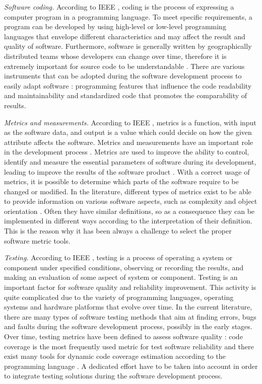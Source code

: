 \documentclass[journal]{IEEEtran}
\begin{document}
\emph{Software coding.} According to IEEE \cite{radatz}, coding is the process of expressing a computer
program in a programming language. To meet specific requirements, a program can be developed by using
high-level or low-level programming languages that envelope different characteristics and may affect the
result and quality of software. Furthermore, software is generally written by geographically distributed
teams whose developers can change over time, therefore it is extremely important for source code to be
understandable \cite{tashtoush}. There are various instruments that can be adopted during the software
development process to easily adapt software \cite{buse, baggen}: programming features that influence the
code readability and maintainability and standardized code that promotes the comparability of results. 

\emph{Metrics and measurements.} According to IEEE \cite{radatz}, metrics is a function, with input as 
the software data, and output is a value which could decide on how the given attribute affects the software.
Metrics and measurements have an important role in the development process \cite{fenton, capers}. Metrics
are used to improve the ability to control, identify and measure the essential parameters of software 
during its development, leading to improve the results of the software product \cite{goodman}. With a correct
usage of metrics, it is possible to determine which parts of the software require to be changed or modified.
In the literature, different types of metrics exist to be able to provide information on various software
aspects, such as complexity \cite{mccabe} and object orientation \cite{chidamber, lorenz}. Often they have 
similar definitions, so as a consequence they can be implemented in different ways according to the
interpretation of their definition. This is the reason why it has been always a challenge to select the
proper software metric tools.

\emph{Testing.} According to IEEE \cite{radatz}, testing is a process of operating a system or component
under specified conditions, observing or recording the results, and making an evaluation of some aspect of
system or component. Testing is an important factor for software quality and reliability improvement. This
activity is quite complicated due to the variety of programming languages, operating systems and hardware
platforms that evolve over time. In the current literature, there are many types of software
testing methods \cite{myers} that aim at finding errors, bugs and faults during the software development
process, possibly in the early stages. Over time, testing metrics have been defined to assess software
quality \cite{athanasiou}: code coverage is the most frequently used metric for test software reliability
and there exist many tools for dynamic code coverage estimation according to the programming language
\cite{horgan}. A dedicated effort have to be taken into account in order to integrate testing solutions
during the software development process.
\end{document}
